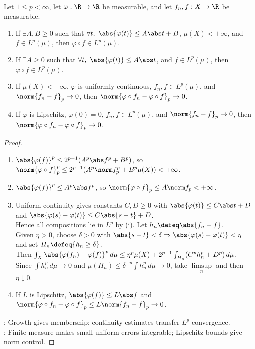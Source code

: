 \begin{proposition} \label{prop:lp-composition-growth-and-continuity} \\
Let $1\leq p<\infty$, let $\varphi:\R\to\R$ be measurable, and let $f_n,f:X\to\R$ be measurable.
\begin{enumerate}[label=(\roman*)]
\setlength{\itemsep}{0pt}
\item If $\exists A,B\geq0$ such that $\forall t,\ \abs{\varphi(t)}\leq A\abs t+B$, $\mu(X)<+\infty$, and $f\in L^p(\mu)$, then $\varphi\circ f\in L^p(\mu)$.
\item If $\exists A\geq0$ such that $\forall t,\ \abs{\varphi(t)}\leq A\abs t$, and $f\in L^p(\mu)$, then $\varphi\circ f\in L^p(\mu)$.
\item If $\mu(X)<+\infty$, $\varphi$ is uniformly continuous, $f_n,f\in L^p(\mu)$, and $\norm{f_n-f}_p\to0$, then $\norm{\varphi\circ f_n-\varphi\circ f}_p\to0$.
\item If $\varphi$ is Lipschitz, $\varphi(0)=0$, $f_n,f\in L^p(\mu)$, and $\norm{f_n-f}_p\to0$, then $\norm{\varphi\circ f_n-\varphi\circ f}_p\to0$.
\end{enumerate}
\begin{proof}
\begin{enumerate}[label=(\roman*)]
\setlength{\itemsep}{0pt}
\item $\abs{\varphi(f)}^p\leq2^{p-1}(A^p\abs f^p+B^p)$, so $\norm{\varphi\circ f}_p^p\leq2^{p-1}(A^p\norm f_p^p+B^p\mu(X))<+\infty$.
\item $\abs{\varphi(f)}^p\leq A^p\abs f^p$, so $\norm{\varphi\circ f}_p\leq A\norm f_p<+\infty$.
\item Uniform continuity gives constants $C,D\geq0$ with $\abs{\varphi(t)}\leq C\abs t+D$ and $\abs{\varphi(s)-\varphi(t)}\leq C\abs{s-t}+D$.\\
Hence all compositions lie in $L^p$ by (i). Let $h_n\defeq\abs{f_n-f}$.\\
Given $\eta>0$, choose $\delta>0$ with $\abs{s-t}<\delta\Rightarrow\abs{\varphi(s)-\varphi(t)}<\eta$ and set $H_n\defeq\{h_n\geq\delta\}$.\\
Then $\int_X\abs{\varphi(f_n)-\varphi(f)}^p\,d\mu\leq\eta^p\mu(X)+2^{p-1}\int_{H_n}(C^ph_n^p+D^p)\,d\mu$.\\
Since $\int h_n^p\,d\mu\to0$ and $\mu(H_n)\leq\delta^{-p}\int h_n^p\,d\mu\to0$, take $\limsup\limits_n$ and then $\eta\downarrow0$.
\item If $L$ is Lipschitz, $\abs{\varphi(f)}\leq L\abs f$ and $\norm{\varphi\circ f_n-\varphi\circ f}_p\leq L\norm{f_n-f}_p\to0$.
\end{enumerate}
: Growth gives membership; continuity estimates transfer $L^p$ convergence.\\
: Finite measure makes small uniform errors integrable; Lipschitz bounds give norm control.
\end{proof}
\end{proposition}


